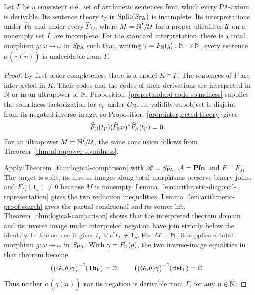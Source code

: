 \begin{theorem}
\label{thm:arithmetic-internal-comparison}
Let $\Gamma$ be a consistent c.e.\ set of arithmetic sentences
from which every PA-axiom is derivable. Its sentence theory
$t_\Gamma$ in $\operatorname{Split}(S_{\mathrm{PA}})$ is incomplete.
Its interpretations under $\widehat F_{\mathbb N}$ and under every
$\widehat F_M$, where $M=\mathbb N^I/\mathcal U$ for a proper ultrafilter
$\mathcal U$ on a nonempty set $I$, are incomplete.
For the standard interpretation, there is a total morphism
$g:\omega\to\omega$ in $S_{\mathrm{PA}}$ such that, writing
$\gamma=F_{\mathbb N}(g):\mathbb N\to\mathbb N$, every sentence
$\alpha(\overline{\gamma(n)})$ is undecidable from $\Gamma$.
\end{theorem}
\begin{proof}
By first-order completeness there is a model $K\models\Gamma$.
The sentences of $\Gamma$ are interpreted in $K$. Their codes and
the codes of their derivations are interpreted in $\mathbb N$ or in an ultrapower
of $\mathbb N$.
Proposition~\ref{prop:standard-code-soundness} supplies the
soundness factorization for $c_\Gamma$ under $G_{\mathbb N}$.
Its validity subobject is disjoint from its negated inverse
image, so Proposition~\ref{prop:interpreted-theory} gives
\[
 \widehat F_{\mathbb N}(t_\Gamma)
    (\widehat F_{\mathbb N}\nu)^*\widehat F_{\mathbb N}(t_\Gamma)=0.
\]
For an ultrapower $M=\mathbb N^I/\mathcal U$, the same conclusion
follows from Theorem~\ref{thm:ultrapower-soundness}.

Apply Theorem~\ref{thm:logical-comparison} with
$\mathscr R=S_{\mathrm{PA}}$, $\mathcal A=\mathbf{Pfn}$ and $F=F_M$.
The target is split, its inverse images along total morphisms preserve binary
joins, and $F_M(1_\omega)\ne0$ because $M$ is nonempty.
Lemma~\ref{lem:arithmetic-diagonal-representation} gives the
two reduction inequalities. Lemma~\ref{lem:arithmetic-proof-search}
gives the partial conditional and its source lift.
Theorem~\ref{thm:logical-comparison} shows that the interpreted theorem domain
and its inverse image under interpreted negation have join strictly below the
identity. In the source it gives $t_\Gamma\vee\nu^*t_\Gamma\ne1_S$.
For $M=\mathbb N$, it supplies a total morphism $g:\omega\to\omega$
in $S_{\mathrm{PA}}$. With $\gamma=F_{\mathbb N}(g)$, the two inverse-image
equalities in that theorem become
\[
 \bigl((G_{\mathbb N}\theta)\gamma\bigr)^{-1}(\mathsf{Th}_\Gamma)
 =\varnothing,
 \qquad
 \bigl((G_{\mathbb N}\theta)\gamma\bigr)^{-1}(\mathsf{Ref}_\Gamma)
 =\varnothing.
\]
Thus neither $\alpha(\overline{\gamma(n)})$ nor its negation
is derivable from $\Gamma$, for any $n\in\mathbb N$.
\end{proof}

